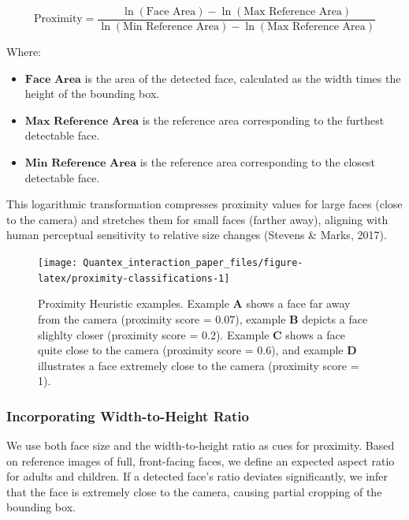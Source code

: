 \documentclass[
  man,floatsintext]{apa6}
\providecommand{\tightlist}{%
  \setlength{\itemsep}{0pt}\setlength{\parskip}{0pt}}
\begin{document}
\[
\text{Proximity} = \frac{\ln(\text{Face Area}) - \ln(\text{Max Reference Area})}{\ln(\text{Min Reference Area}) - \ln(\text{Max Reference Area})}
\]

Where:

\begin{itemize}
\tightlist
\item
  \(\textbf{Face Area}\) is the area of the detected face, calculated as the width times the height of the bounding box.
\item
  \(\textbf{Max Reference Area}\) is the reference area corresponding to the furthest detectable face.
\item
  \(\textbf{Min Reference Area}\) is the reference area corresponding to the closest detectable face.
\end{itemize}

This logarithmic transformation compresses proximity values for large faces (close to the camera) and stretches them for small faces (farther away), aligning with human perceptual sensitivity to relative size changes (Stevens \& Marks, 2017).

\begin{figure}

{\centering \texttt{[image: Quantex\_interaction\_paper\_files/figure-latex/proximity-classifications-1]} 

}

\caption{Proximity Heuristic examples. Example \textbf{A} shows a face far away from the camera (proximity score = 0.07), example \textbf{B} depicts a face slighlty closer (proximity score = 0.2). Example \textbf{C} shows a face quite close to the camera (proximity score = 0.6), and example \textbf{D} illustrates a face extremely close to the camera (proximity score = 1).}\label{fig:proximity-classifications}
\end{figure}

\subsubsection{Incorporating Width-to-Height Ratio}\label{incorporating-width-to-height-ratio}

We use both face size and the width-to-height ratio as cues for proximity.
Based on reference images of full, front-facing faces, we define an expected aspect ratio for adults and children. If a detected face's ratio deviates significantly, we infer that the face is extremely close to the camera, causing partial cropping of the bounding box.
\end{document}
